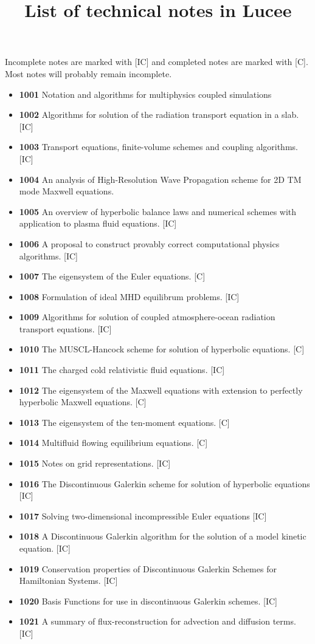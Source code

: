 \documentclass[11pt]{article}
\title{List of technical notes in Lucee}
\author{}
\date{}
\begin{document}
\maketitle

Incomplete notes are marked with [IC] and completed notes are marked
with [C]. Most notes will probably remain incomplete.

\begin{itemize}
\item {\bf 1001} Notation and algorithms for multiphysics coupled
  simulations
\item {\bf 1002} Algorithms for solution of the radiation transport
  equation in a slab. [IC]
\item {\bf 1003} Transport equations, finite-volume schemes and
  coupling algorithms. [IC]
\item {\bf 1004} An analysis of High-Resolution Wave Propagation
  scheme for 2D TM mode Maxwell equations.
\item {\bf 1005} An overview of hyperbolic balance laws and
  numerical schemes with application to plasma fluid equations. [IC]
\item {\bf 1006} A proposal to construct provably correct
  computational physics algorithms. [IC]
\item {\bf 1007} The eigensystem of the Euler equations. [C]
\item {\bf 1008} Formulation of ideal MHD equilibrum problems. [IC]
\item {\bf 1009} Algorithms for solution of coupled atmosphere-ocean
  radiation transport equations. [IC]
\item {\bf 1010} The MUSCL-Hancock scheme for solution of hyperbolic
  equations. [C]
\item {\bf 1011} The charged cold relativistic fluid equations. [IC]
\item {\bf 1012} The eigensystem of the Maxwell equations with
  extension to perfectly hyperbolic Maxwell equations. [C]
\item {\bf 1013} The eigensystem of the ten-moment equations. [C]
\item {\bf 1014} Multifluid flowing equilibrium equations. [C]
\item {\bf 1015} Notes on grid representations. [IC]
\item {\bf 1016} The Discontinuous Galerkin scheme for solution of
  hyperbolic equations [IC]
\item {\bf 1017} Solving two-dimensional incompressible Euler
  equations [IC]
\item {\bf 1018} A Discontinuous Galerkin algorithm for the solution
  of a model kinetic equation. [IC]
\item {\bf 1019} Conservation properties of Discontinuous Galerkin
  Schemes for Hamiltonian Systems. [IC]
\item {\bf 1020} Basis Functions for use in discontinuous Galerkin
  schemes. [IC]
\item {\bf 1021} A summary of flux-reconstruction for advection and
  diffusion terms. [IC]
\end{itemize}
\end{document}
